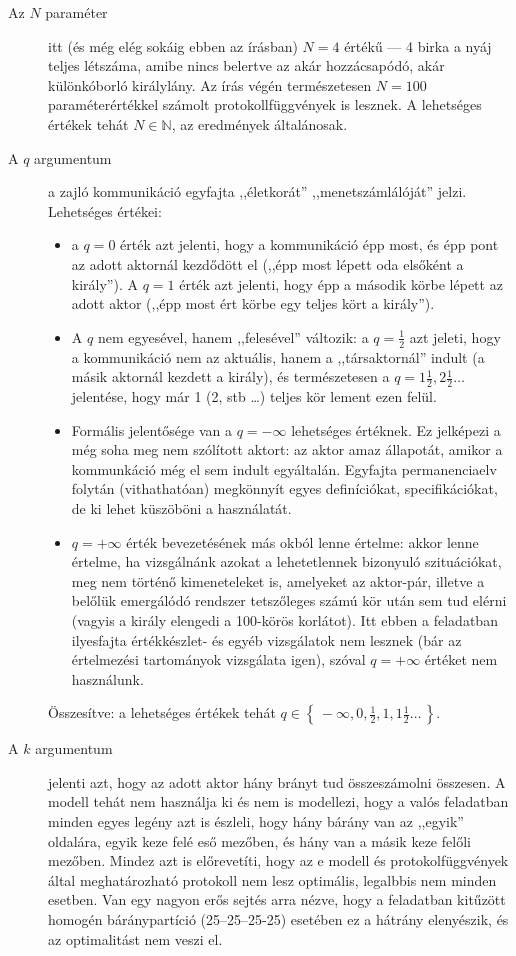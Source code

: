 \documentclass{article}
\newcommand{\setOf}[1]{\left\lbrace\,#1\,\right\rbrace}
\begin{document}
	\begin{description}
		\item[Az $N$ paraméter] itt (és még elég sokáig ebben az írásban) $N=4$ értékű --- 4 birka a nyáj teljes létszáma, amibe nincs belertve az akár hozzácsapódó, akár különkóborló királylány.
		Az írás végén természetesen $N=100$ paraméterértékkel számolt protokollfüggvények is lesznek.
		A lehetséges értékek tehát $N \in \mathbb N$, az eredmények általánosak.

		\item[A $q$ argumentum] a zajló kommunikáció egyfajta ,,életkorát'' ,,menetszámlálóját'' jelzi.
		Lehetséges értékei:
		\begin{itemize}
			\item a $q = 0$ érték azt jelenti, hogy a kommunikáció épp most, és épp pont az adott aktornál kezdődött el (,,épp most lépett oda elsőként a király''). A $q = 1$ érték azt jelenti, hogy épp a második körbe lépett az adott aktor (,,épp most ért körbe egy teljes kört a király'').
			\item A $q$ nem egyesével, hanem ,,felesével'' változik: a $q = \frac12$ azt jeleti, hogy a kommunikáció nem az aktuális, hanem a ,,társaktornál'' indult (a másik aktornál kezdett a király), és természetesen a $q = 1\frac12, 2\frac12 \dots$ jelentése, hogy már 1 (2, stb \dots) teljes kör lement ezen felül.
			\item Formális jelentősége van a $q = -\infty$ lehetséges értéknek. Ez jelképezi a még soha meg nem szólított aktort: az aktor amaz állapotát, amikor a kommunkáció még el sem indult egyáltalán. Egyfajta permanenciaelv folytán (vithathatóan) megkönnyít egyes definíciókat, specifikációkat, de ki lehet küszöböni a használatát.
			\item $q = +\infty$ érték bevezetésének más okból lenne értelme: akkor lenne értelme, ha vizsgálnánk azokat a lehetetlennek bizonyuló szituációkat, meg nem történő kimeneteleket is, amelyeket az aktor-pár, illetve a belőlük emergálódó rendszer tetszőleges számú kör után sem tud elérni (vagyis a király elengedi a 100-körös korlátot). Itt ebben a feladatban ilyesfajta értékkészlet- és egyéb vizsgálatok nem lesznek (bár az értelmezési tartományok vizsgálata igen), szóval $q = +\infty$ értéket nem használunk.
		\end{itemize}
		Összesítve: a lehetséges értékek tehát $q \in \setOf{-\infty, 0, \frac12, 1, 1\frac12\dots}$.

		\item[A $k$ argumentum] jelenti azt, hogy az adott aktor hány brányt tud összeszámolni összesen.
		A modell tehát nem használja ki és nem is modellezi, hogy a valós feladatban minden egyes legény azt is észleli, hogy hány bárány van az ,,egyik'' oldalára, egyik keze felé eső mezőben, és hány van a másik keze felőli mezőben. Mindez azt is előrevetíti, hogy az e modell és protokolfüggvények által meghatározható protokoll nem lesz optimális, legalbbis nem minden esetben. Van egy nagyon erős sejtés arra nézve, hogy a feladatban kitűzött homogén báránypartíció (25--25--25-25) esetében ez a hátrány elenyészik, és az optimalitást nem veszi el.


\end{description}
\end{document}

